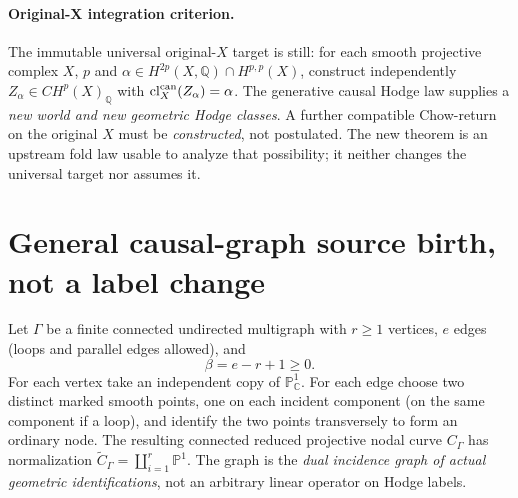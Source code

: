 \documentclass[11pt]{article}
\begin{document}
\paragraph{Original-X integration criterion.}
The immutable universal original-$X$ target is still:
for each smooth projective complex $X$, $p$ and
$\alpha\in H^{2p}(X,\mathbb Q)\cap H^{p,p}(X)$,
construct independently
\(Z_\alpha\in CH^p(X)_{\mathbb Q}\)
with \(\mathrm{cl}^{\rm can}_X(Z_\alpha)=\alpha\).
The generative causal Hodge law supplies a \emph{new world and
new geometric Hodge classes}. A further compatible Chow-return
on the original $X$ must be \emph{constructed}, not postulated.
The new theorem is an upstream fold law usable to analyze that
possibility; it neither changes the universal target nor assumes it.
\medskip

\section{General causal-graph source birth, not a label change}
Let $\Gamma$ be a finite connected undirected multigraph with
$r\geq1$ vertices, $e$ edges (loops and parallel edges allowed), and
\[
                  \beta=e-r+1\geq0.
\]
For each vertex take an independent copy of $\mathbb P^1_{\mathbb C}$.
For each edge choose two distinct marked smooth points, one on each
incident component (on the same component if a loop), and identify the
two points transversely to form an ordinary node.  The resulting
connected reduced projective nodal curve $C_\Gamma$ has normalization
\(\widetilde C_\Gamma=\coprod_{i=1}^r\mathbb P^1\).
The graph is the \emph{dual incidence graph of actual geometric
identifications}, not an arbitrary linear operator on Hodge labels.
\end{document}
